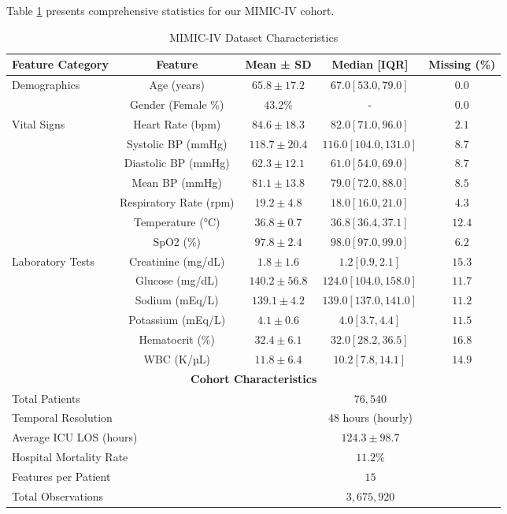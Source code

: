 \documentclass[letterpaper]{article}
\begin{document}
\begin{enumerate}
Table \ref{tab:mimic_stats} presents comprehensive statistics for our MIMIC-IV cohort.

\begin{table}[htbp]
\centering
\caption{MIMIC-IV Dataset Characteristics}
\label{tab:mimic_stats}
\begin{tabular}{@{}lcccc@{}}
\toprule
\textbf{Feature Category} & \textbf{Feature} & \textbf{Mean ± SD} & \textbf{Median [IQR]} & \textbf{Missing (\%)} \\
\midrule
\multirow{2}{*}{Demographics} 
& Age (years) & $65.8 \pm 17.2$ & $67.0 [53.0, 79.0]$ & $0.0$ \\
& Gender (Female \%) & $43.2\%$ & - & $0.0$ \\
\midrule
\multirow{7}{*}{Vital Signs}
& Heart Rate (bpm) & $84.6 \pm 18.3$ & $82.0 [71.0, 96.0]$ & $2.1$ \\
& Systolic BP (mmHg) & $118.7 \pm 20.4$ & $116.0 [104.0, 131.0]$ & $8.7$ \\
& Diastolic BP (mmHg) & $62.3 \pm 12.1$ & $61.0 [54.0, 69.0]$ & $8.7$ \\
& Mean BP (mmHg) & $81.1 \pm 13.8$ & $79.0 [72.0, 88.0]$ & $8.5$ \\
& Respiratory Rate (rpm) & $19.2 \pm 4.8$ & $18.0 [16.0, 21.0]$ & $4.3$ \\
& Temperature (°C) & $36.8 \pm 0.7$ & $36.8 [36.4, 37.1]$ & $12.4$ \\
& SpO2 (\%) & $97.8 \pm 2.4$ & $98.0 [97.0, 99.0]$ & $6.2$ \\
\midrule
\multirow{6}{*}{Laboratory Tests}
& Creatinine (mg/dL) & $1.8 \pm 1.6$ & $1.2 [0.9, 2.1]$ & $15.3$ \\
& Glucose (mg/dL) & $140.2 \pm 56.8$ & $124.0 [104.0, 158.0]$ & $11.7$ \\
& Sodium (mEq/L) & $139.1 \pm 4.2$ & $139.0 [137.0, 141.0]$ & $11.2$ \\
& Potassium (mEq/L) & $4.1 \pm 0.6$ & $4.0 [3.7, 4.4]$ & $11.5$ \\
& Hematocrit (\%) & $32.4 \pm 6.1$ & $32.0 [28.2, 36.5]$ & $16.8$ \\
& WBC (K/µL) & $11.8 \pm 6.4$ & $10.2 [7.8, 14.1]$ & $14.9$ \\
\midrule
\multicolumn{5}{c}{\textbf{Cohort Characteristics}} \\
\midrule
\multicolumn{2}{l}{Total Patients} & \multicolumn{3}{c}{$76,540$} \\
\multicolumn{2}{l}{Temporal Resolution} & \multicolumn{3}{c}{48 hours (hourly)} \\
\multicolumn{2}{l}{Average ICU LOS (hours)} & \multicolumn{3}{c}{$124.3 \pm 98.7$} \\
\multicolumn{2}{l}{Hospital Mortality Rate} & \multicolumn{3}{c}{$11.2\%$} \\
\multicolumn{2}{l}{Features per Patient} & \multicolumn{3}{c}{$15$} \\
\multicolumn{2}{l}{Total Observations} & \multicolumn{3}{c}{$3,675,920$} \\
\bottomrule
\end{tabular}
\end{table}


\end{enumerate}
\end{document}
